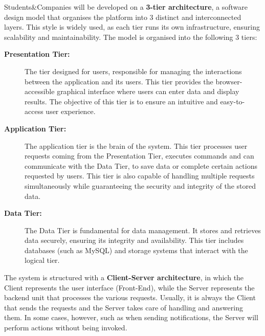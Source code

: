 Students\&Companies will be developed on a \textbf{3-tier architecture}, a software design model that organises the platform into 3 distinct and interconnected layers. This style is widely used, as each tier runs its own infrastructure, ensuring scalability and maintainability.
The model is organised into the following 3 tiers:

\begin{description}
    \item[\textbf{Presentation Tier:}]The tier designed for users, responsible for managing the interactions between the application and its users. This tier provides the browser-accessible graphical interface where users can enter data and display results. The objective of this tier is to ensure an intuitive and easy-to-access user experience.
    \item[\textbf{Application Tier:}] The application tier is the brain of the system. This tier processes user requests coming from the Presentation Tier, executes commands and can communicate with the Data Tier, to save data or complete certain actions requested by users. This tier is also capable of handling multiple requests simultaneously while guaranteeing the security and integrity of the stored data.
    \item[\textbf{Data Tier:}] The Data Tier is fundamental for data management. It stores and retrieves data securely, ensuring its integrity and availability. This tier includes databases (such as MySQL) and storage systems that interact with the logical tier.
\end{description}

The system is structured with a \textbf{Client-Server architecture}, in which the Client represents the user interface (Front-End), while the Server represents the backend unit that processes the various requests. Usually, it is always the Client that sends the requests and the Server takes care of handling and answering them. In some cases, however, such as when sending notifications, the Server will perform actions without being invoked.

